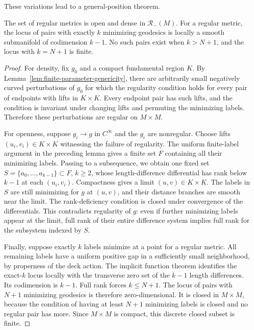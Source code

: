 These variations lead to a general-position theorem.

\begin{theorem}\label{thm:genericity}
The set of regular metrics is open and dense
in $\mathcal R_-(M)$.
For a regular metric, the locus of pairs with
exactly $k$ minimizing geodesics is locally a
smooth submanifold of codimension $k-1$.
No such pairs exist when $k>N+1$, and the
locus with $k=N+1$ is finite.
\end{theorem}

\begin{proof}
For density, fix $g_0$ and a compact
fundamental region $K$. By
Lemma~\ref{lem:finite-parameter-genericity},
there are arbitrarily small negatively
curved perturbations of $g_0$ for which
the regularity condition holds for every
pair of endpoints with lifts in $K\times K$.
Every endpoint pair has such lifts, and
the condition is invariant under changing
lifts and permuting the minimizing labels.
Therefore these perturbations are
regular on $M\times M$.

For openness, suppose $g_i\to g$ in
$C^\infty$ and the $g_i$ are nonregular.
Choose lifts $(u_i,v_i)\in K\times K$
witnessing the failure of regularity.
The uniform finite-label argument
in the preceding lemma gives a finite
set $F$ containing all their minimizing
labels. Passing to a subsequence, we
obtain one fixed set
$S=\{a_0,\ldots,a_{k-1}\}\subset F$,
$k\geq2$, whose length-difference
differential has rank below $k-1$
at each $(u_i,v_i)$. Compactness gives
a limit $(u,v)\in K\times K$.
The labels in $S$ are still minimizing
for $g$ at $(u,v)$, and their distance
branches are smooth near the limit.
The rank-deficiency condition is closed
under convergence of the differentials.
This contradicts regularity of $g$:
even if further minimizing labels appear
at the limit, full rank of their entire
difference system implies full rank for
the subsystem indexed by $S$.

Finally, suppose exactly $k$ labels
minimize at a point for a regular metric.
All remaining labels have a uniform
positive gap in a sufficiently small
neighborhood, by properness of the deck
action. The implicit function theorem
identifies the exact-$k$ locus locally
with the transverse zero set of the
$k-1$ length differences. Its codimension
is $k-1$. Full rank forces $k\leq N+1$.
The locus of pairs with $N+1$
minimizing geodesics is therefore
zero-dimensional. It is closed in
$M\times M$, because the condition of
having at least $N+1$ minimizing labels
is closed and no regular pair has more.
Since $M\times M$ is compact, this
discrete closed subset is finite.
\end{proof}

